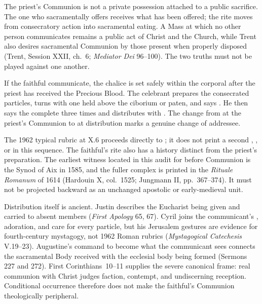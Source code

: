 The priest's Communion is not a private possession attached to a public sacrifice. The one who sacramentally offers receives what has been offered; the rite moves from consecratory action into sacramental eating. A Mass at which no other person communicates remains a public act of Christ and the Church, while Trent also desires sacramental Communion by those present when properly disposed (Trent, Session XXII, ch.~6; \emph{Mediator Dei} 96--100). The two truths must not be played against one another.


If the faithful communicate, the chalice is set safely within the corporal after the priest has received the Precious Blood. The celebrant prepares the consecrated particles, turns with one held above the ciborium or paten, and says . He then says the complete  three times and distributes with . The change from  at the priest's Communion to  at distribution marks a genuine change of addressee.

The 1962 typical rubric at  X.6 proceeds directly to ; it does not print a second , , or  in this sequence. The faithful's rite also has a history distinct from the priest's preparation. The earliest witness located in this audit for  before Communion is the Synod of Aix in 1585, and the fuller complex is printed in the \emph{Rituale Romanum} of 1614 (Hardouin X, col.~1525; Jungmann II, pp.~367--374). It must not be projected backward as an unchanged apostolic or early-medieval unit.

Distribution itself is ancient. Justin describes the Eucharist being given and carried to absent members (\emph{First Apology} 65, 67). Cyril joins the communicant's , adoration, and care for every particle, but his Jerusalem gestures are evidence for fourth-century mystagogy, not 1962 Roman rubrics (\emph{Mystagogical Catechesis} V.19--23). Augustine's command to become what the communicant sees connects the sacramental Body received with the ecclesial body being formed (Sermons 227 and 272). First Corinthians~10--11 supplies the severe canonical frame: real communion with Christ judges faction, contempt, and undiscerning reception. Conditional occurrence therefore does not make the faithful's Communion theologically peripheral.

